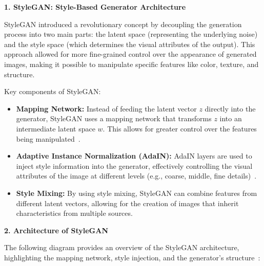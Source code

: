 \textbf{1. StyleGAN: Style-Based Generator Architecture}

StyleGAN introduced a revolutionary concept by decoupling the generation process into two main parts: the latent space (representing the underlying noise) and the style space (which determines the visual attributes of the output). This approach allowed for more fine-grained control over the appearance of generated images, making it possible to manipulate specific features like color, texture, and structure.

Key components of StyleGAN:
\begin{itemize}
    \item \textbf{Mapping Network:} Instead of feeding the latent vector $z$ directly into the generator, StyleGAN uses a mapping network that transforms $z$ into an intermediate latent space $w$. This allows for greater control over the features being manipulated~\cite{zhang2022styleswin}.
    \item \textbf{Adaptive Instance Normalization (AdaIN):} AdaIN layers are used to inject style information into the generator, effectively controlling the visual attributes of the image at different levels (e.g., coarse, middle, fine details)~\cite{karras2019style}.
    \item \textbf{Style Mixing:} By using style mixing, StyleGAN can combine features from different latent vectors, allowing for the creation of images that inherit characteristics from multiple sources.
\end{itemize}

\textbf{2. Architecture of StyleGAN}

The following diagram provides an overview of the StyleGAN architecture, highlighting the mapping network, style injection, and the generator's structure~\cite{karras2019style}:

\begin{center}
\end{center}

